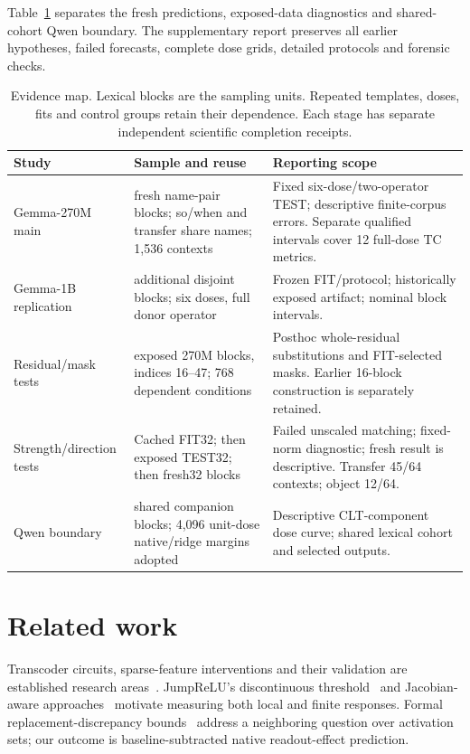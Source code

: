 \documentclass[11pt]{article}
\begin{document}
Table~\ref{tab:scope} separates the fresh predictions, exposed-data diagnostics and shared-cohort Qwen boundary. The supplementary report preserves all earlier hypotheses, failed forecasts, complete dose grids, detailed protocols and forensic checks.

\begin{table}[ht]\centering\scriptsize
\setlength{\tabcolsep}{4pt}
\begin{tabular}{>{\raggedright\arraybackslash}p{}>{\raggedright\arraybackslash}p{}>{\raggedright\arraybackslash}p{}}\toprule
Study & Sample and reuse & Reporting scope\\\midrule
Gemma-270M main & 256 fresh name-pair blocks; so/when and transfer share names; 1,536 contexts & Fixed six-dose/two-operator TEST; descriptive finite-corpus errors. Separate qualified intervals cover 12 full-dose TC metrics.\\[3pt]
Gemma-1B replication & 256 additional disjoint blocks; six doses, full donor operator & Frozen FIT/protocol; historically exposed artifact; nominal block intervals.\\[3pt]
Residual/mask tests & 32 exposed 270M blocks, indices 16--47; 768 dependent conditions & Posthoc whole-residual substitutions and FIT-selected masks. Earlier 16-block construction is separately retained.\\[3pt]
Strength/direction tests & Cached FIT32; then exposed TEST32; then fresh32 blocks & Failed unscaled matching; fixed-norm diagnostic; fresh result is descriptive. Transfer 45/64 contexts; object 12/64.\\[3pt]
Qwen boundary & 256 shared companion blocks; 4,096 unit-dose native/ridge margins adopted & Descriptive CLT-component dose curve; shared lexical cohort and selected outputs.\\\bottomrule
\end{tabular}
\caption{Evidence map. Lexical blocks are the sampling units. Repeated templates, doses, fits and control groups retain their dependence. Each stage has separate independent scientific completion receipts.}\label{tab:scope}
\end{table}

\section{Related work}
Transcoder circuits, sparse-feature interventions and their validation are established research areas~\cite{dunefsky2024,ameisen2025}. JumpReLU's discontinuous threshold~\cite{rajamanoharan2024} and Jacobian-aware approaches~\cite{farnik2025,shabalin2026} motivate measuring both local and finite responses. Formal replacement-discrepancy bounds~\cite{ladner2026} address a neighboring question over activation sets; our outcome is baseline-subtracted native readout-effect prediction.
\end{document}
